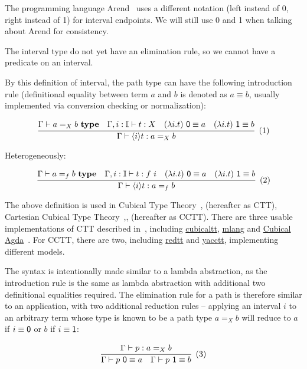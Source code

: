 \documentclass{article}
\newcommand{\lrangle}[1]{\langle #1\rangle}
\newcommand\xtag{
\refstepcounter{equation}%
\;\;\text{(\theequation)}}
\begin{document}
The programming language Arend~\cite{Arend} uses a different notation
(\textsf{left} instead of \textsf 0, \textsf{right} instead of \textsf 1)
for interval endpoints.
We will still use \textsf 0 and \textsf 1 when talking
about Arend for consistency.

The interval type do not yet have an elimination rule,
so we cannot have a predicate on an interval.

By this definition of interval, the path type can
have the following introduction rule
(definitional equality between term $a$ and $b$
is denoted as $a \equiv b$,
usually implemented via conversion checking or normalization):

\[
  \cfrac{
    \Gamma \vdash a =_X b \ \textbf{type}
    \quad
    \Gamma, i : \mathbb I \vdash t : X
    \quad
    (\lambda i. t) \ \textsf 0 \equiv a
    \quad
    (\lambda i. t) \ \textsf 1 \equiv b
  }{
    \Gamma \vdash \lrangle i t : a =_X b
  }
  \xtag
\]

Heterogeneously:

\[
  \cfrac{
    \Gamma \vdash a =_f b \ \textbf{type}
    \quad
    \Gamma, i : \mathbb I \vdash t : f \ i
    \quad
    (\lambda i. t) \ \textsf 0 \equiv a
    \quad
    (\lambda i. t) \ \textsf 1 \equiv b
  }{
    \Gamma \vdash \lrangle i t : a =_f b
  }
  \xtag
\]

The above definition is used in Cubical Type Theory~\cite{CCHM},\cite{CHM}
(hereafter as CTT), Cartesian Cubical Type
Theory~\cite{CCTT},\cite{CCTT2},\cite{CHTT} (hereafter as CCTT).
There are three usable implementations of CTT described in~\cite{CHM},
including \href{https://github.com/mortberg/cubicaltt}{cubicaltt},
\href{https://github.com/molikto/mlang}{mlang} and
\href{https://agda.readthedocs.io/en/v2.6.0.1/language/cubical.html}
{Cubical Agda}~\cite{CubicalAgda}.
For CCTT, there are two, including
\href{https://github.com/RedPRL/redtt}{redtt}
and \href{https://github.com/mortberg/yacctt}{yacctt},
implementing different models.

The syntax is intentionally made similar to a lambda abstraction,
as the introduction rule is the same as lambda abstraction with
additional two definitional equalities required.
The elimination rule for a path is therefore similar to an application,
with two additional reduction rules -- applying an interval $i$ to
an arbitrary term whose type is known to be a path type $a =_X b$
will reduce to $a$ if $i \equiv \textsf 0$ or $b$ if $i \equiv \textsf 1$:

\[
  \cfrac{
    \Gamma \vdash p : a =_X b
  }{
    \Gamma \vdash p\ \textsf 0 \equiv a
    \quad
    \Gamma \vdash p\ \textsf 1 \equiv b
  }
  \xtag \label{eqn:path-app}
\]
\end{document}
